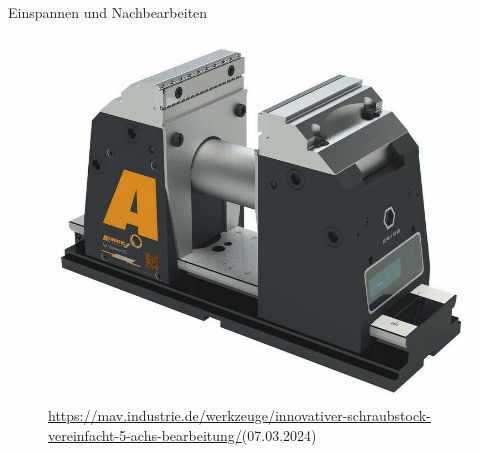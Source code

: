 \documentclass[../slides.tex]{subfiles}
\begin{document}
\begin{frame}{Einspannen und Nachbearbeiten}
  \begin{figure}[]
      \includegraphics[height=\textheight-70pt]{img_niklas/TeleSense_mit_Backen_final_93BB1CAF-5AC9-467B-ABD7-22EEFC24189A.jpg}
      \caption{\tiny{\url{https://mav.industrie.de/werkzeuge/innovativer-schraubstock-vereinfacht-5-achs-bearbeitung/}}(07.03.2024)}
      \label{fig:schraubstock}
    \end{figure}
    
\end{frame}
\end{document}
